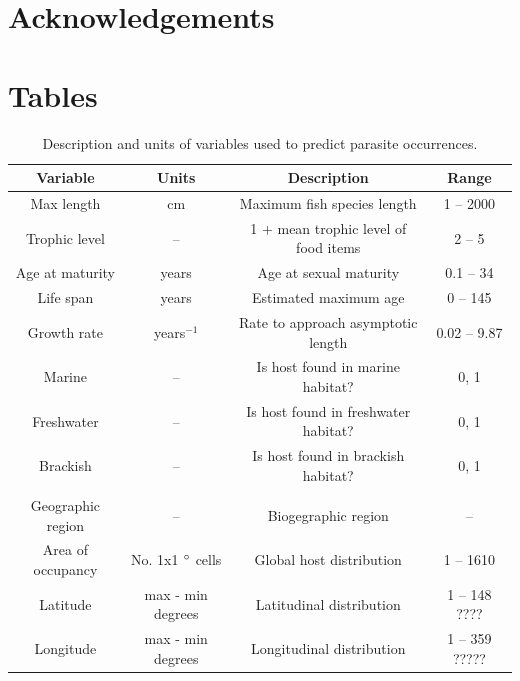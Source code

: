 \documentclass[12pt]{article}
\begin{document}
  \paragraph{}
 
 
 
 
 
 
 
 
 
\section{Acknowledgements}










\newpage
\section*{Tables}
  \begin{table}[!h]
  \caption{Description and units of variables used to predict parasite occurrences.}
  \vspace{0.1cm}
  \begin{tabular}{cccc}
\hline
  \textbf{Variable} &   \textbf{Units} &   \textbf{Description} &   \textbf{Range} \\ 
\hline
Max length      & cm           & Maximum fish species length  & 1 -- 2000 \\ 
Trophic level   & --           & 1 + mean trophic level of food items   &  2 -- 5\\ 
Age at maturity & years        & Age at sexual maturity  & 0.1 -- 34  \\ 
Life span       & years        & Estimated maximum age & 0 -- 145  \\ 
Growth rate     & years$^{-1}$ & Rate to approach asymptotic length & 0.02 -- 9.87 \\ 
Marine          & --           & Is host found in marine habitat? & 0, 1  \\ 
Freshwater      & --           & Is host found in freshwater habitat? & 0, 1 \\ 
Brackish        & --           & Is host found in brackish habitat? & 0, 1 \\ 
 & & &  \\
Geographic region   & --      &   Biogegraphic region        & -- \\ 
Area of occupancy   & No. 1x1 $\degree$ cells &  Global host distribution  & 1 -- 1610    \\
Latitude            & max - min degrees & Latitudinal distribution      & 1 -- 148 ???? \\ 
Longitude           & max - min degrees & Longitudinal distribution         & 1 -- 359 ????? \\ 

\hline
  \end{tabular}
  \label{tab:traits}
\end{table}
\end{document}
